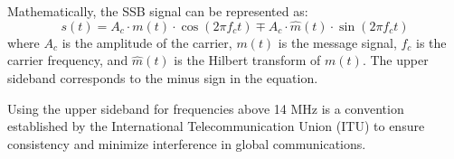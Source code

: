 Mathematically, the SSB signal can be represented as:
\[
s(t) = A_c \cdot m(t) \cdot \cos(2\pi f_c t) \mp A_c \cdot \hat{m}(t) \cdot \sin(2\pi f_c t)
\]
where \( A_c \) is the amplitude of the carrier, \( m(t) \) is the message signal, \( f_c \) is the carrier frequency, and \( \hat{m}(t) \) is the Hilbert transform of \( m(t) \). The upper sideband corresponds to the minus sign in the equation.

Using the upper sideband for frequencies above 14 MHz is a convention established by the International Telecommunication Union (ITU) to ensure consistency and minimize interference in global communications.


